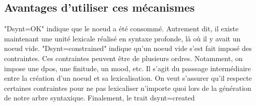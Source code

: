\subsection{Avantages d'utiliser ces mécanismes}

"Dsynt=OK" indique que le noeud a été consommé. Autrement dit, il existe maintenant une unité lexicale réalisé en syntaxe profonde, là où il y avait un noeud vide.
"Dsynt=constrained" indique qu'un noeud vide s'est fait imposé des contraintes. Ces contraintes peuvent être de plusieurs ordres. Notamment, on impose une dpos, une finitude, un mood, etc. Il s'agit du passsage intermédiaire entre la création d'un noeud et sa lexicalisation. On veut s'assurer qu'il respecte certaines contraintes pour ne pas lexicaliser n'importe quoi lors de la génération de notre arbre syntaxique.
Finalement, le trait dsynt=created 

